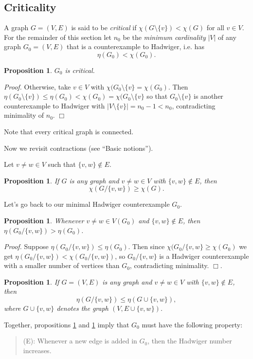 \documentclass[12pt, a4paper]{amsart}
\newtheorem{proposition}[lemma]{\bf Proposition}
\begin{document}
\subsection{Criticality} A graph $G=(V,E)$ is said to be {\em critical}
if $\chi(G\setminus \{v\}) < \chi(G)$ for all $v\in V$.
For the remainder of this section let $n_0$ be the {\em minimum
cardinality} $|V|$ of any graph $G_0=(V,E)$ that is a counterexample
to Hadwiger, i.e. has $$\eta(G_0) < \chi(G_0).$$
\begin{proposition} 
$G_0$ is critical.
\end{proposition}
{\em Proof.} Otherwise, take $v\in V$ with $\chi(G_0\setminus 
\{v\} = \chi(G_0)$.
Then $\eta(G_0\setminus\{v\}) \leq \eta(G_0) < \chi(G_0) = \chi(G_0
	\setminus\{v\}$ so that $G_0\setminus \{v\}$ is
	another counterexample to Hadwiger with $|V\setminus\{v\}| =
	n_0-1 < n_0$, contradicting minimality of $n_0$. 
	\hfill{$\Box$}

Note that every critical graph is connected.

Now we revisit contractions (see ``Basic notions''). 

Let $v\neq w\in V$ such that $\{v,w\}\notin E$.
\begin{proposition}
If $G$ is any graph and $v\neq w\in V$ with $\{v,w\}\notin E$, then
	$$\chi(G/\{v,w\}) \geq \chi(G).$$
\end{proposition}

Let's go back to our minimal Hadwiger counterexample $G_0$.

\begin{proposition} \label{contractprop}
Whenever $v\neq w \in V(G_0)$ and $\{v,w\}\notin E$, then
$\eta(G_0/\{v,w\}) > \eta(G_0)$.
\end{proposition}
{\em Proof.} Suppose $\eta(G_0/\{v,w\}) \leq \eta(G_0)$. Then since
$\chi(G_0/\{v,w\} \geq \chi(G_0)$ we get $\eta(G_0/\{v,w\}) < 
\chi(G_0/\{v,w\})$, so $G_0/\{v,w\}$ is a Hadwiger counterexample
with a smaller number of vertices than $G_0$, contradicting minimality.
\hfill{$\Box$}.

\begin{proposition} \label{edgeprop}
If $G=(V,E)$ is any graph and $v\neq w\in V$ with $\{v,w\} \notin E$,
then $$\eta(G/\{v,w\}) \leq \eta(G \cup \{v,w\}),$$
where $G\cup \{v,w\}$ denotes the graph $(V, E\cup\{v,w\})$.
\end{proposition}

Together, propositions \ref{contractprop} and \ref{edgeprop}
imply that $G_0$ must have the following property:
\begin{quote}
	(E): Whenever a new edge is added in $G_0$, then the
	Hadwiger number increases.
\end{quote}
\end{document}
